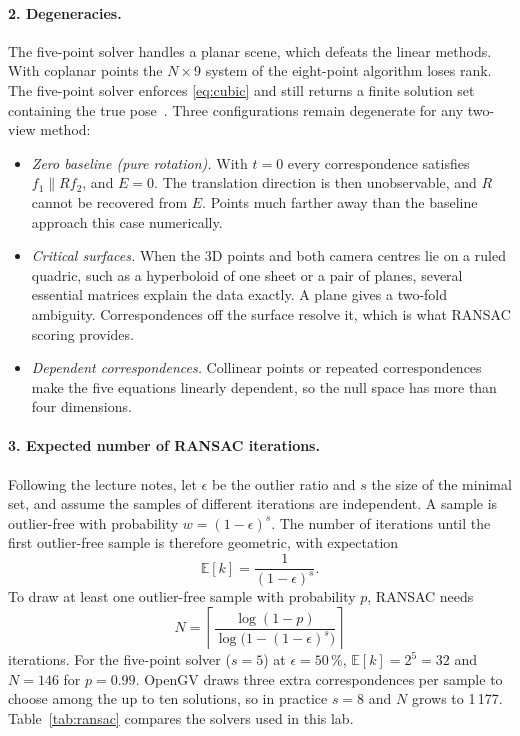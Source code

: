 \documentclass[11pt,a4paper]{article}
\begin{document}
\paragraph{2. Degeneracies.}
The five-point solver handles a planar scene, which defeats the linear methods. With
coplanar points the $N\times 9$ system of the eight-point algorithm loses rank. The
five-point solver enforces \eqref{eq:cubic} and still returns a finite solution set
containing the true pose~\cite{nister2003efficient}. Three configurations remain
degenerate for any two-view method:
\begin{itemize}
  \item \emph{Zero baseline (pure rotation).} With $t = 0$ every correspondence
    satisfies $f_1 \parallel R f_2$, and $E = 0$. The translation direction is then
    unobservable, and $R$ cannot be recovered from $E$. Points much farther away
    than the baseline approach this case numerically.
  \item \emph{Critical surfaces.} When the 3D points and both camera centres lie on a
    ruled quadric, such as a hyperboloid of one sheet or a pair of planes, several
    essential matrices explain the data exactly. A plane gives a two-fold ambiguity.
    Correspondences off the surface resolve it, which is what RANSAC scoring provides.
  \item \emph{Dependent correspondences.} Collinear points or repeated
    correspondences make the five equations linearly dependent, so the null space
    has more than four dimensions.
\end{itemize}

\paragraph{3. Expected number of RANSAC iterations.}
Following the lecture notes, let $\epsilon$ be the outlier ratio and $s$ the size of
the minimal set, and assume the samples of different iterations are independent. A
sample is outlier-free with probability $w = (1-\epsilon)^s$. The number of iterations
until the first outlier-free sample is therefore geometric, with expectation
\begin{equation}
  \mathbb{E}[k] = \frac{1}{(1-\epsilon)^{s}} .
\end{equation}
To draw at least one outlier-free sample with probability $p$, RANSAC needs
\begin{equation}
  N = \left\lceil \frac{\log(1-p)}{\log\bigl(1-(1-\epsilon)^{s}\bigr)} \right\rceil
  \label{eq:ransac}
\end{equation}
iterations. For the five-point solver ($s = 5$) at $\epsilon = 50\,\%$,
$\mathbb{E}[k] = 2^5 = 32$ and $N = 146$ for $p = 0.99$. OpenGV draws three extra
correspondences per sample to choose among the up to ten solutions, so in practice
$s = 8$ and $N$ grows to 1\,177. Table~\ref{tab:ransac} compares the solvers used in
this lab.
\end{document}
